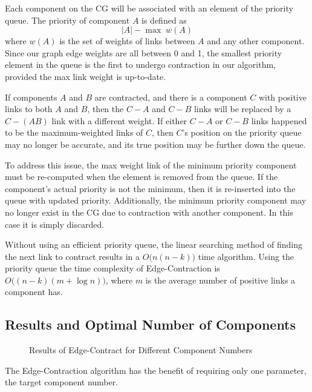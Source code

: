 Each component on the CG will be associated with an element of the
priority queue. The priority of component $A$ is defined as
\[ |A| - \max\;w(A) \]
where $w(A)$ is the set of weights of links between $A$ and any other
component. Since our graph edge weights are all between 0 and 1,
the smallest priority element in the queue is the first to undergo
contraction in our algorithm, provided the max link weight is up-to-date.

If components $A$ and $B$ are contracted, and there is a component $C$
with positive links to both $A$ and $B$, then the $C-A$ and $C-B$ links
will be replaced by a $C-(AB)$ link with a different weight. If either
$C-A$ or $C-B$ links happened to be the maximum-weighted links of $C$,
then $C$'s position on the priority queue may no longer be accurate, and
its true position may be further down the queue.

To address this issue, the max weight link of the minimum priority
component must be re-computed when the element is removed from the queue.
If the component's actual priority is not the minimum, then it is
re-inserted into the queue with updated priority.
Additionally, the minimum priority component may no longer exist in the
CG due to contraction with another component. In this case it is simply
discarded.

Without using an efficient priority queue, the linear searching method
of finding the next link to contract results in a $O\big(n (n-k)\big)$
time algorithm. Using the priority queue the time complexity of
Edge-Contraction is $O \big((n - k) (m + \log n)\big)$, where $m$ is
the average number of positive links a component has.

\subsection{Results and Optimal Number of Components}

\begin{figure}
\caption{Results of Edge-Contract for Different Component Numbers}
\end{figure}

The Edge-Contraction algorithm has the benefit of requiring only one
parameter, the target component number.

